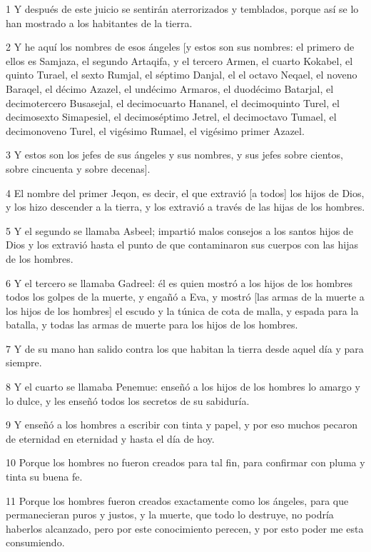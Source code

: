 \par 1 Y después de este juicio se sentirán aterrorizados y temblados, porque así se lo han mostrado a los habitantes de la tierra.
\par 2 Y he aquí los nombres de esos ángeles [y estos son sus nombres: el primero de ellos es Samjaza, el segundo Artaqifa, y el tercero Armen, el cuarto Kokabel, el quinto Turael, el sexto Rumjal, el séptimo Danjal, el el octavo Neqael, el noveno Baraqel, el décimo Azazel, el undécimo Armaros, el duodécimo Batarjal, el decimotercero Busasejal, el decimocuarto Hananel, el decimoquinto Turel, el decimosexto Simapesiel, el decimoséptimo Jetrel, el decimoctavo Tumael, el decimonoveno Turel, el vigésimo Rumael, el vigésimo primer Azazel.
\par 3 Y estos son los jefes de sus ángeles y sus nombres, y sus jefes sobre cientos, sobre cincuenta y sobre decenas].
\par 4 El nombre del primer Jeqon, es decir, el que extravió [a todos] los hijos de Dios, y los hizo descender a la tierra, y los extravió a través de las hijas de los hombres.
\par 5 Y el segundo se llamaba Asbeel; impartió malos consejos a los santos hijos de Dios y los extravió hasta el punto de que contaminaron sus cuerpos con las hijas de los hombres.
\par 6 Y el tercero se llamaba Gadreel: él es quien mostró a los hijos de los hombres todos los golpes de la muerte, y engañó a Eva, y mostró [las armas de la muerte a los hijos de los hombres] el escudo y la túnica de cota de malla, y espada para la batalla, y todas las armas de muerte para los hijos de los hombres.
\par 7 Y de su mano han salido contra los que habitan la tierra desde aquel día y para siempre.
\par 8 Y el cuarto se llamaba Penemue: enseñó a los hijos de los hombres lo amargo y lo dulce, y les enseñó todos los secretos de su sabiduría.
\par 9 Y enseñó a los hombres a escribir con tinta y papel, y por eso muchos pecaron de eternidad en eternidad y hasta el día de hoy.
\par 10 Porque los hombres no fueron creados para tal fin, para confirmar con pluma y tinta su buena fe.
\par 11 Porque los hombres fueron creados exactamente como los ángeles, para que permanecieran puros y justos, y la muerte, que todo lo destruye, no podría haberlos alcanzado, pero por este conocimiento perecen, y por esto poder me esta consumiendo.
